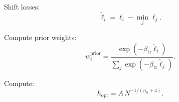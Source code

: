 \documentclass{article}
\theoremstyle{definition}
\begin{document}
\begin{algorithm}[H]
\DontPrintSemicolon
\caption{\textbf{Stage 1B: Prior Weight Construction}}


\BlankLine
Shift losses:
\[
  \tilde\ell_i=\ell_i-\min_j\ell_j.
\]

Compute prior weights:
\[
  w_i^{\mathrm{prior}}=
  \frac{\exp(-\beta_{\mathrm{tr}}\tilde\ell_i)}
       {\sum_j\exp(-\beta_{\mathrm{tr}}\tilde\ell_j)}.
\]

\end{algorithm}


\begin{algorithm}[H]
\DontPrintSemicolon
\caption{\textbf{Stage 1C: KDE Bandwidth Computation}}


\BlankLine
Compute:
\[
  h_{\mathrm{opt}} = A\,N^{-1/(n_h+4)}.
\]

\end{algorithm}
\end{document}
